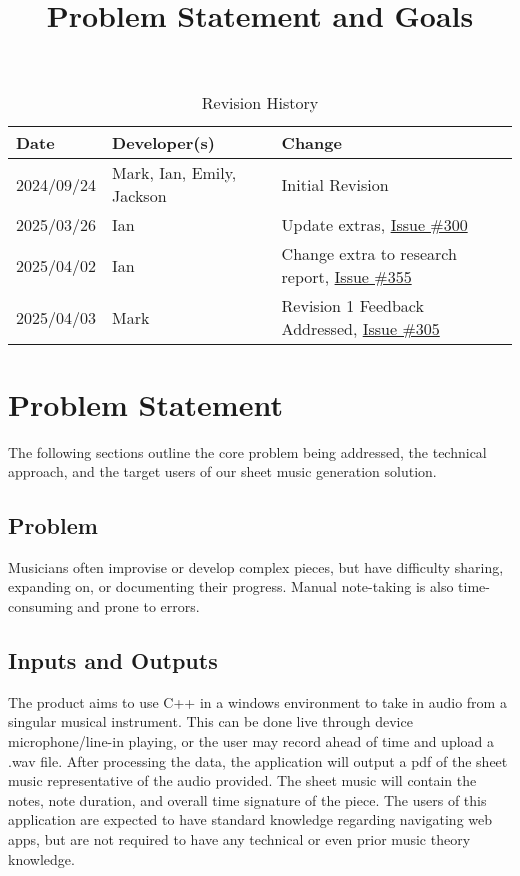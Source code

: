 \documentclass{article}
\title{Problem Statement and Goals\\\progname}
\author{\authname}
\date{}
\begin{document}
\maketitle

\begin{table}[hp]
\caption{Revision History} \label{TblRevisionHistory}
\begin{tabularx}{\textwidth}{llX}
\toprule
\textbf{Date} & \textbf{Developer(s)} & \textbf{Change}\\
\midrule
2024/09/24 & Mark, Ian, Emily, Jackson & Initial Revision\\
2025/03/26 & Ian & Update extras, \href{https://github.com/emilyperica/ScoreGen/issues/300}{Issue \#300}\\
2025/04/02 & Ian & Change extra to research report, \href{https://github.com/emilyperica/ScoreGen/issues/355}{Issue \#355}\\
2025/04/03 & Mark & Revision 1 Feedback Addressed, \href{https://github.com/emilyperica/ScoreGen/issues/305}{Issue \#305}\\
\bottomrule
\end{tabularx}
\end{table}

\section{Problem Statement}
The following sections outline the core problem being addressed, the technical approach, 
and the target users of our sheet music generation solution.

\subsection{Problem}
Musicians often improvise or develop complex pieces, but have difficulty sharing, expanding on, or documenting their progress. Manual note-taking is also time-consuming and prone to errors.

\subsection{Inputs and Outputs}

The product aims to use C++ in a windows environment to take in audio from a singular musical instrument. This can be done live through device microphone/line-in playing, or the user may record ahead of time and upload a .wav file. After processing the data, the application will output a pdf of the sheet music representative of the audio provided. The sheet music will contain the notes, note duration, and overall time signature of the piece. The users of this application are expected to have standard knowledge regarding navigating web apps, but are not required to have any technical or even prior music theory knowledge.
\end{document}
